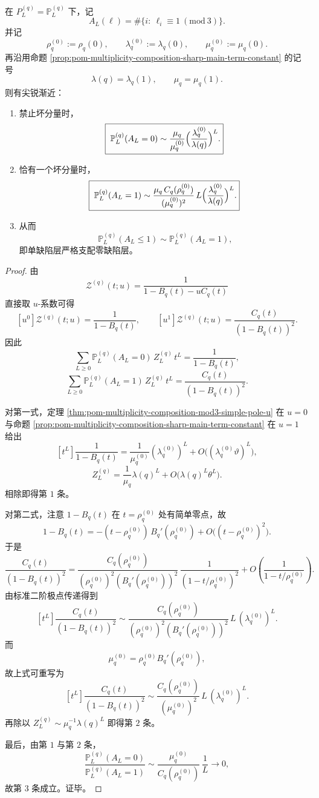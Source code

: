 \begin{theorem}[禁止坏分量与单缺陷层的尖锐主项]\label{thm:pom-multiplicity-composition-mod3-zero-one-defect-sharp}
在 \(P_L^{(q)}=\mathbb P_L^{(q)}\) 下，记
\[
A_L(\boldsymbol{\ell})=\#\{i:\ \ell_i\equiv 1\ (\mathrm{mod}\ 3)\}.
\]
并记
\[
\rho_q^{(0)}:=\rho_q(0),
\qquad
\lambda_q^{(0)}:=\lambda_q(0),
\qquad
\mu_q^{(0)}:=\mu_q(0).
\]
再沿用命题 \ref{prop:pom-multiplicity-composition-sharp-main-term-constant} 的记号
\[
\lambda(q)=\lambda_q(1),
\qquad
\mu_q=\mu_q(1).
\]
则有尖锐渐近：
\begin{enumerate}
  \item 禁止坏分量时，
  \[
  \boxed{\;
  \mathbb P_L^{(q)}(A_L=0)
  \sim
  \frac{\mu_q}{\mu_q^{(0)}}\Bigl(\frac{\lambda_q^{(0)}}{\lambda(q)}\Bigr)^L.}
  \]
  \item 恰有一个坏分量时，
  \[
  \boxed{\;
  \mathbb P_L^{(q)}(A_L=1)
  \sim
  \frac{\mu_q\,C_q(\rho_q^{(0)})}{(\mu_q^{(0)})^2}\,
  L\Bigl(\frac{\lambda_q^{(0)}}{\lambda(q)}\Bigr)^L.}
  \]
  \item 从而
  \[
  \boxed{\;
  \mathbb P_L^{(q)}(A_L\le 1)\sim \mathbb P_L^{(q)}(A_L=1),}
  \]
  即单缺陷层严格支配零缺陷层。
\end{enumerate}
\end{theorem}
\begin{proof}
由
\[
\mathcal Z^{(q)}(t;u)=\frac{1}{1-B_q(t)-uC_q(t)}
\]
直接取 \(u\)-系数可得
\[
[u^0]\mathcal Z^{(q)}(t;u)=\frac{1}{1-B_q(t)},
\qquad
[u^1]\mathcal Z^{(q)}(t;u)=\frac{C_q(t)}{(1-B_q(t))^2}.
\]
因此
\[
\sum_{L\ge 0}\mathbb P_L^{(q)}(A_L=0)\,Z_L^{(q)}\,t^L=\frac{1}{1-B_q(t)},
\]
\[
\sum_{L\ge 0}\mathbb P_L^{(q)}(A_L=1)\,Z_L^{(q)}\,t^L=\frac{C_q(t)}{(1-B_q(t))^2}.
\]

对第一式，定理 \ref{thm:pom-multiplicity-composition-mod3-simple-pole-u} 在 \(u=0\) 与命题 \ref{prop:pom-multiplicity-composition-sharp-main-term-constant} 在 \(u=1\) 给出
\[
[t^L]\frac{1}{1-B_q(t)}
=
\frac{1}{\mu_q^{(0)}}(\lambda_q^{(0)})^L
+ O\!\bigl((\lambda_q^{(0)}\vartheta)^L\bigr),
\]
\[
Z_L^{(q)}
=
\frac{1}{\mu_q}\lambda(q)^L+O\!\bigl(\lambda(q)^L\theta^L\bigr).
\]
相除即得第 \(1\) 条。

对第二式，注意 \(1-B_q(t)\) 在 \(t=\rho_q^{(0)}\) 处有简单零点，故
\[
1-B_q(t)=-(t-\rho_q^{(0)})\,B_q'(\rho_q^{(0)})+O\!\bigl((t-\rho_q^{(0)})^2\bigr).
\]
于是
\[
\frac{C_q(t)}{(1-B_q(t))^2}
=
\frac{C_q(\rho_q^{(0)})}{(\rho_q^{(0)})^2(B_q'(\rho_q^{(0)}))^2}\,
\frac{1}{(1-t/\rho_q^{(0)})^2}
+ O\!\left(\frac{1}{1-t/\rho_q^{(0)}}\right).
\]
由标准二阶极点传递得到
\[
[t^L]\frac{C_q(t)}{(1-B_q(t))^2}
\sim
\frac{C_q(\rho_q^{(0)})}{(\rho_q^{(0)})^2(B_q'(\rho_q^{(0)}))^2}\,
L\,(\lambda_q^{(0)})^L.
\]
而
\[
\mu_q^{(0)}=\rho_q^{(0)}B_q'(\rho_q^{(0)}),
\]
故上式可重写为
\[
[t^L]\frac{C_q(t)}{(1-B_q(t))^2}
\sim
\frac{C_q(\rho_q^{(0)})}{(\mu_q^{(0)})^2}\,L\,(\lambda_q^{(0)})^L.
\]
再除以 \(Z_L^{(q)}\sim \mu_q^{-1}\lambda(q)^L\) 即得第 \(2\) 条。

最后，由第 \(1\) 与第 \(2\) 条，
\[
\frac{\mathbb P_L^{(q)}(A_L=0)}{\mathbb P_L^{(q)}(A_L=1)}
\sim
\frac{\mu_q^{(0)}}{C_q(\rho_q^{(0)})}\,\frac{1}{L}\longrightarrow 0,
\]
故第 \(3\) 条成立。证毕。
\end{proof}


